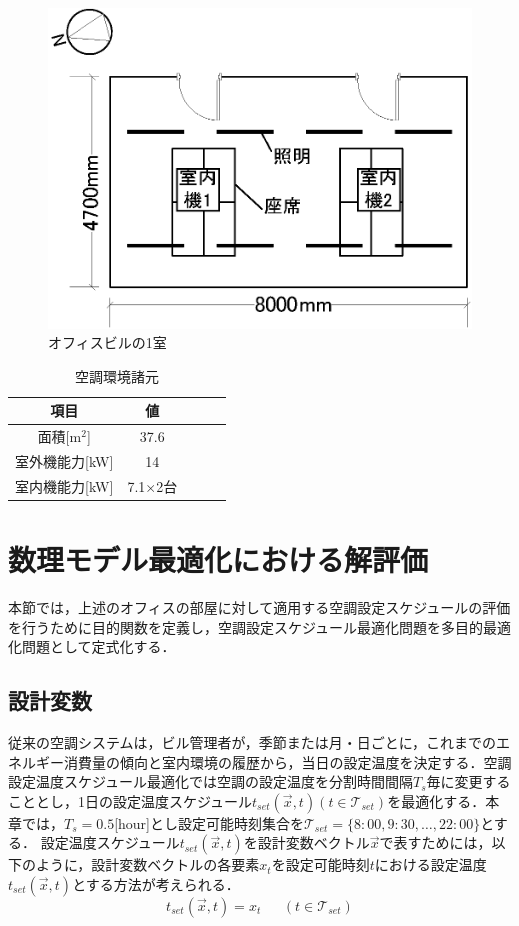 \begin{figure}[t]
  \begin{center}
    \includegraphics[width=0.6\linewidth]{fig/math_office_room.eps}
  \end{center}
  \vspace{-0.5cm}
  \caption{オフィスビルの1室}
  \label{fig::math_office_room}
\end{figure}

\begin{table}[b]
  \caption{空調環境諸元}
  \label{tab::math_office_spec}
  \centering
  \begin{tabular}{c|cccc}
    \hline
    項目           & 値               \\
    \hline    \hline
    面積[m$^2$]    & 37.6             \\
    室外機能力[kW] & 14               \\
    室内機能力[kW] & 7.1$ \times $2台 \\
    \hline
  \end{tabular}
\end{table}

\section{数理モデル最適化における解評価}
本節では，上述のオフィスの部屋に対して適用する空調設定スケジュールの評価を行うために目的関数を定義し，空調設定スケジュール最適化問題を多目的最適化問題として定式化する．

\subsection{設計変数}
従来の空調システムは，ビル管理者が，季節または月・日ごとに，これまでのエネルギー消費量の傾向と室内環境の履歴から，当日の設定温度を決定する．空調設定温度スケジュール最適化では空調の設定温度を分割時間間隔$T_s$毎に変更することとし，1日の設定温度スケジュール$t_{set}(\vec{x},t) (t \in \mathcal{T}_{set})$を最適化する．本章では，$T_s=0.5$[hour]とし設定可能時刻集合を$\mathcal{T}_{set}=\{8:00, 9:30,\dots, 22:00\}$とする．
設定温度スケジュール$t_{set}(\vec{x},t)$を設計変数ベクトル$\vec{x}$で表すためには，以下のように，設計変数ベクトルの各要素$x_t$を設定可能時刻$t$における設定温度$t_{set}(\vec{x},t)$とする方法が考えられる．
\begin{equation}
  t_{set}(\vec{x},t) = x_t ~~~~~~~(t \in \mathcal{T}_{set})
  \label{eq::math_variable}
\end{equation}


